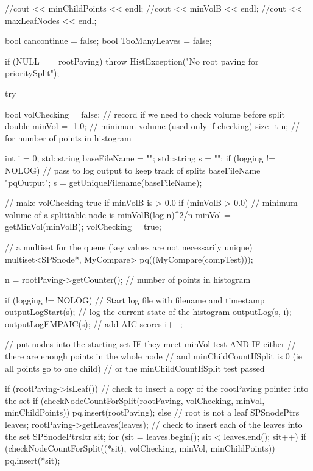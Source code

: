 \begin{DoxyCode}
{    
    //cout << minChildPoints << endl;
    //cout << minVolB << endl;
    //cout << maxLeafNodes << endl;

    
    bool cancontinue = false;
    bool TooManyLeaves = false;
    
    if (NULL == rootPaving) {
            throw HistException("No root paving for prioritySplit");
    }

    try {

        bool volChecking = false; // record if we need to check volume before
       split
        double minVol = -1.0; // minimum volume (used only if checking)
        size_t n; // for number of points in histogram

        int i = 0;
        std::string baseFileName = "";
        std::string s = "";
        if (logging != NOLOG) {
            // pass to log output to keep track of splits
            baseFileName = "pqOutput";
            s = getUniqueFilename(baseFileName);
        }

        // make volChecking true if minVolB is > 0.0
        if (minVolB > 0.0) {
            // minimum volume of a splittable node is minVolB(log n)^2/n
            minVol = getMinVol(minVolB);
           volChecking = true;
        }

        // a multiset for the queue (key values are not necessarily unique)
        multiset<SPSnode*, MyCompare> pq((MyCompare(compTest)));

        n = rootPaving->getCounter(); // number of points in histogram

        if (logging != NOLOG) {
             // Start log file with filename and timestamp
            outputLogStart(s);
            // log the current state of the histogram
            outputLog(s, i);
            outputLogEMPAIC(s); // add AIC scores
            i++;
        }

        // put nodes into the starting set IF they meet minVol test AND IF
       either
        // there are enough points in the whole node
                // and minChildCountIfSplit is 0 (ie all points go to one
       child)
        // or the minChildCountIfSplit test passed

        if (rootPaving->isLeaf()) {
            // check to insert a copy of the rootPaving pointer into the set
            if (checkNodeCountForSplit(rootPaving, volChecking, minVol,
                minChildPoints)) {
                    pq.insert(rootPaving);
            }
        }
        else { // root is not a leaf
            SPSnodePtrs leaves;
            rootPaving->getLeaves(leaves);
            // check to insert each of the leaves into the set
            SPSnodePtrsItr sit;
            for (sit = leaves.begin(); sit < leaves.end(); sit++) {
                if (checkNodeCountForSplit((*sit), volChecking, minVol,
                minChildPoints)) {
                    pq.insert(*sit);
                }
            }
        }

}}
\end{DoxyCode}
